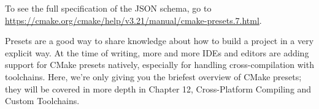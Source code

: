 To see the full specification of the JSON schema, go to \url{https://cmake.org/cmake/help/v3.21/manual/cmake-presets.7.html}.

Presets are a good way to share knowledge about how to build a project in a very explicit way. At the time of writing, more and more IDEs and editors are adding support for CMake presets natively, especially for handling cross-compilation with toolchains. Here, we're only giving you the briefest overview of CMake presets; they will be covered in more depth in Chapter 12, Cross-Platform Compiling and Custom Toolchains.









































